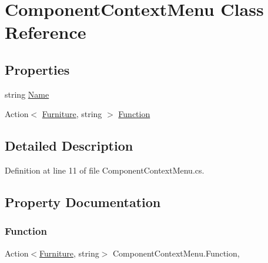 \hypertarget{class_component_context_menu}{}\section{Component\+Context\+Menu Class Reference}
\label{class_component_context_menu}
\subsection*{Properties}
\begin{DoxyCompactItemize}
\item 
string \hyperlink{class_component_context_menu_acc11a46dc7fdeb2fe9665a6ddbdd7fff}{Name}
\item 
Action$<$ \hyperlink{class_furniture}{Furniture}, string $>$ \hyperlink{class_component_context_menu_abfe932a876917d809682d82a4a093fde}{Function}
\end{DoxyCompactItemize}


\subsection{Detailed Description}


Definition at line 11 of file Component\+Context\+Menu.\+cs.



\subsection{Property Documentation}
\mbox{\label{class_component_context_menu_abfe932a876917d809682d82a4a093fde}} 
\subsubsection{\texorpdfstring{Function}{Function}}
{\footnotesize\ttfamily Action$<$\hyperlink{class_furniture}{Furniture}, string$>$ Component\+Context\+Menu.\+Function\hspace{0.3cm}{\ttfamily [get]}, {\ttfamily [set]}}



